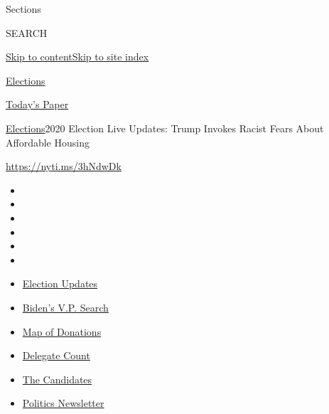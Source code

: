Sections

SEARCH

\protect\hyperlink{site-content}{Skip to
content}\protect\hyperlink{site-index}{Skip to site index}

\href{https://www.nytimes.com/news-event/2020-election}{Elections}

\href{https://myaccount.nytimes.com/auth/login?response_type=cookie\&client_id=vi}{}

\href{https://www.nytimes.com/section/todayspaper}{Today's Paper}

\href{/news-event/2020-election}{Elections}\textbar{}2020 Election Live
Updates: Trump Invokes Racist Fears About Affordable Housing

\url{https://nyti.ms/3hNdwDk}

\begin{itemize}
\item
\item
\item
\item
\item
\item
\end{itemize}

\begin{itemize}
\item
  \href{https://www.nytimes.com/2020/07/29/us/elections/biden-vs-trump.html?action=click\&pgtype=Article\&state=default\&region=TOP_BANNER\&context=storylines_menu}{Election
  Updates}
\item
  \href{https://www.nytimes.com/article/biden-vice-president-2020.html?action=click\&pgtype=Article\&state=default\&region=TOP_BANNER\&context=storylines_menu}{Biden's
  V.P. Search}
\item
  \href{https://www.nytimes.com/interactive/2020/07/24/us/politics/trump-biden-campaign-donors.html?action=click\&pgtype=Article\&state=default\&region=TOP_BANNER\&context=storylines_menu}{Map
  of Donations}
\item
  \href{https://www.nytimes.com/interactive/2020/us/elections/delegate-count-primary-results.html?action=click\&pgtype=Article\&state=default\&region=TOP_BANNER\&context=storylines_menu}{Delegate
  Count}
\item
  \href{https://www.nytimes.com/interactive/2019/us/politics/2020-presidential-candidates.html?action=click\&pgtype=Article\&state=default\&region=TOP_BANNER\&context=storylines_menu}{The
  Candidates}
\item
  \href{https://www.nytimes.com/newsletters/politics?action=click\&pgtype=Article\&state=default\&region=TOP_BANNER\&context=storylines_menu}{Politics
  Newsletter}
\end{itemize}

